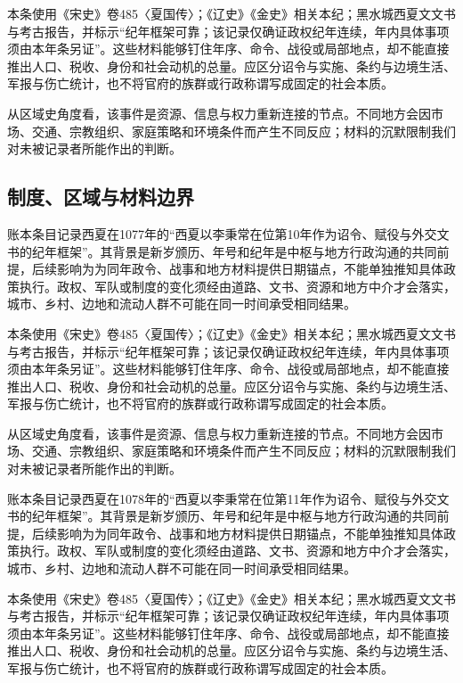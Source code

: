 本条使用《宋史》卷485〈夏国传〉；《辽史》《金史》相关本纪；黑水城西夏文文书与考古报告，并标示“纪年框架可靠；该记录仅确证政权纪年连续，年内具体事项须由本年条另证”。这些材料能够钉住年序、命令、战役或局部地点，却不能直接推出人口、税收、身份和社会动机的总量。应区分诏令与实施、条约与边境生活、军报与伤亡统计，也不将官府的族群或行政称谓写成固定的社会本质。

从区域史角度看，该事件是资源、信息与权力重新连接的节点。不同地方会因市场、交通、宗教组织、家庭策略和环境条件而产生不同反应；材料的沉默限制我们对未被记录者所能作出的判断。

\subsection{制度、区域与材料边界}

账本条目记录西夏在1077年的“西夏以李秉常在位第10年作为诏令、赋役与外交文书的纪年框架”。其背景是新岁颁历、年号和纪年是中枢与地方行政沟通的共同前提，后续影响为为同年政令、战事和地方材料提供日期锚点，不能单独推知具体政策执行。政权、军队或制度的变化须经由道路、文书、资源和地方中介才会落实，城市、乡村、边地和流动人群不可能在同一时间承受相同结果。

本条使用《宋史》卷485〈夏国传〉；《辽史》《金史》相关本纪；黑水城西夏文文书与考古报告，并标示“纪年框架可靠；该记录仅确证政权纪年连续，年内具体事项须由本年条另证”。这些材料能够钉住年序、命令、战役或局部地点，却不能直接推出人口、税收、身份和社会动机的总量。应区分诏令与实施、条约与边境生活、军报与伤亡统计，也不将官府的族群或行政称谓写成固定的社会本质。

从区域史角度看，该事件是资源、信息与权力重新连接的节点。不同地方会因市场、交通、宗教组织、家庭策略和环境条件而产生不同反应；材料的沉默限制我们对未被记录者所能作出的判断。

账本条目记录西夏在1078年的“西夏以李秉常在位第11年作为诏令、赋役与外交文书的纪年框架”。其背景是新岁颁历、年号和纪年是中枢与地方行政沟通的共同前提，后续影响为为同年政令、战事和地方材料提供日期锚点，不能单独推知具体政策执行。政权、军队或制度的变化须经由道路、文书、资源和地方中介才会落实，城市、乡村、边地和流动人群不可能在同一时间承受相同结果。

本条使用《宋史》卷485〈夏国传〉；《辽史》《金史》相关本纪；黑水城西夏文文书与考古报告，并标示“纪年框架可靠；该记录仅确证政权纪年连续，年内具体事项须由本年条另证”。这些材料能够钉住年序、命令、战役或局部地点，却不能直接推出人口、税收、身份和社会动机的总量。应区分诏令与实施、条约与边境生活、军报与伤亡统计，也不将官府的族群或行政称谓写成固定的社会本质。

